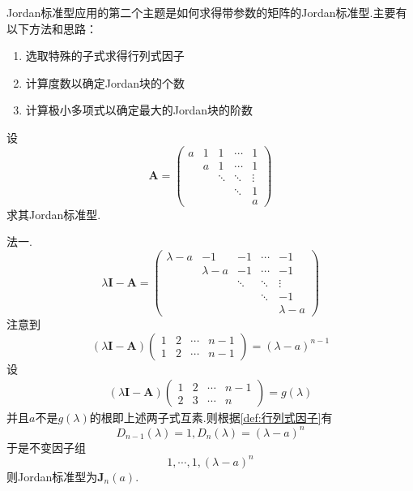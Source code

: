 \begin{red}
    \begin{remark}
        \textup{Jordan}标准型应用的第二个主题是如何求得带参数的矩阵的\textup{Jordan}标准型.主要有以下方法和思路：

        \begin{enumerate}[label={\textup{(\arabic*)}}]
            \item 选取特殊的子式求得行列式因子
            \item 计算度数以确定\textup{Jordan}块的个数
            \item 计算极小多项式以确定最大的\textup{Jordan}块的阶数
        \end{enumerate}
    \end{remark}
\end{red}
\begin{brown}
    \begin{example}
        设\[
        \bm{A}=\begin{pmatrix}
            a&1&1&\cdots&1\\
            &a&1&\cdots&1\\
            &&\ddots&\ddots&\vdots\\
            &&&\ddots&1\\
            &&&&a
        \end{pmatrix}
        \]
        求其\textup{Jordan}标准型.
    \end{example}
    \begin{solution}
        法一.
        \[
        \lambda\bm{I}-\bm{A}=\begin{pmatrix}
            \lambda-a&-1&-1&\cdots&-1\\
            &\lambda-a&-1&\cdots&-1\\
            &&\ddots&\ddots&\vdots\\
            &&&\ddots&-1\\
            &&&&\lambda-a  
        \end{pmatrix}
        \]注意到\[
        \left(
            \lambda\bm{I}-\bm{A}
        \right)\begin{pmatrix}
            1&2&\cdots&n-1\\
            1&2&\cdots&n-1
        \end{pmatrix}=\left(\lambda-a\right)^{n-1}
        \]设\begin{align*}
            \left(
                \lambda\bm{I}-\bm{A}
            \right)\begin{pmatrix}
                1&2&\cdots&n-1\\
                2&3&\cdots&n
            \end{pmatrix}=g\left(\lambda\right)
        \end{align*}并且$a$不是$g\left(\lambda\right)$的根即上述两子式互素.则根据\cref{def:行列式因子}有\[
        D_{n-1}\left(\lambda\right)=1,D_n\left(\lambda\right)=\left(\lambda-a\right)^n
        \]于是不变因子组\[
        1,\cdots,1,\left(\lambda-a\right)^n
        \]则\textup{Jordan}标准型为$\bm{J}_n\left(a\right).$


\end{solution}
\end{brown}
